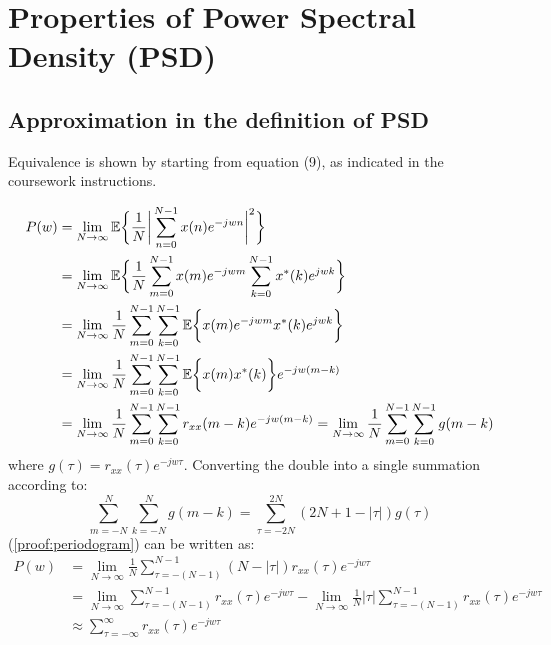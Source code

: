 \section{Properties of Power Spectral Density (PSD)}

\subsection*{Approximation in the definition of PSD}

Equivalence is shown by starting from equation (9), as indicated in the coursework instructions.

\begin{align}
P(w)    & = \lim_{N\to\infty} {\mathbb{E}} \bigg\{ \frac{1}{N} \bigg| \sum_{n=0}^{N-1} x(n) e^{-jwn} \bigg|^{2} \bigg\}
            \label{proof:periodogram:starter}\\
        & = \lim_{N\to\infty} {\mathbb{E}} \bigg\{\frac{1}{N}
            \sum_{m=0}^{N-1} x(m) e^{-jwm} \sum_{k=0}^{N-1} x^{*}(k) e^{jwk} \bigg\}\nonumber\\
        & = \lim_{N\to\infty} \frac{1}{N}
            \sum_{m=0}^{N-1} \sum_{k=0}^{N-1} {\mathbb{E}} \bigg\{ x(m) e^{-jwm} x^{*}(k) e^{jwk} \bigg\}\nonumber\\
        & = \lim_{N\to\infty} \frac{1}{N}
            \sum_{m=0}^{N-1} \sum_{k=0}^{N-1} {\mathbb{E}} \bigg\{ x(m) x^{*}(k) \bigg\} e^{-jw(m-k)} \nonumber\\
        & = \lim_{N\to\infty} \frac{1}{N}
            \sum_{m=0}^{N-1} \sum_{k=0}^{N-1} r_{xx}(m-k) e^{-jw(m-k)}
          = \lim_{N\to\infty} \frac{1}{N}
            \sum_{m=0}^{N-1} \sum_{k=0}^{N-1} g(m-k)
\label{proof:periodogram}
\end{align}
%
where $g(\tau) = r_{xx}(\tau) e^{-jw\tau}$. Converting the double into a single summation according to:
%
\begin{equation}
    \sum_{m=-N}^{N} \sum_{k=-N}^{N} g(m-k) = \sum_{\tau=-2N}^{2N}(2N + 1 - |\tau|)g(\tau)
\label{proof:periodogram:helper}
\end{equation}
%
(\ref{proof:periodogram}) can be written as:
%
\begin{align}
P(w)    & =         \lim_{N\to\infty} \frac{1}{N} \sum_{\tau=-(N-1)}^{N-1}(N - |\tau|)r_{xx}(\tau) e^{-jw\tau}\nonumber\\
        & =         \lim_{N\to\infty} \sum_{\tau=-(N-1)}^{N-1} r_{xx}(\tau) e^{-jw\tau} -
                    \lim_{N\to\infty} \frac{1}{N} |\tau| \sum_{\tau=-(N-1)}^{N-1} r_{xx}(\tau) e^{-jw\tau}\nonumber\\
        & \approx   \sum_{\tau=-\infty}^{\infty} r_{xx}(\tau) e^{-jw\tau}
\label{proof:periodogram:shown}
\end{align}
